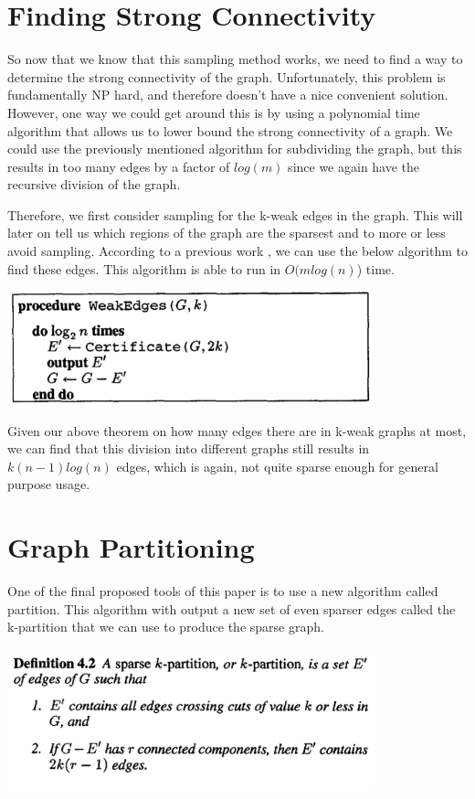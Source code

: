 \documentclass[11pt]{article}
\begin{document}
\section{Finding Strong Connectivity}

So now that we know that this sampling method works, we need to find a way to determine the strong connectivity of the graph. Unfortunately, this problem is fundamentally NP hard, and therefore doesn't have a nice convenient solution. However, one way we could get around this is by using a polynomial time algorithm that allows us to lower bound the strong connectivity of a graph. We could use the previously mentioned algorithm for subdividing the graph, but this results in too many edges by a factor of $log(m)$ since we again have the recursive division of the graph.

Therefore, we first consider sampling for the k-weak edges in the graph. This will later on tell us which regions of the graph are the sparsest and to more or less avoid sampling. According to a previous work \cite{NI92b}, we can use the below algorithm to find these edges. This algorithm is able to run in $O(m log(n)$) time.

\begin{center}
\includegraphics[width=0.8\textwidth]{figures/WeakEdges.png}
\end{center}

Given our above theorem on how many edges there are in k-weak graphs at most, we can find that this division into different graphs still results in $k(n-1)log(n)$ edges, which is again, not quite sparse enough for general purpose usage.

\section{Graph Partitioning}

One of the final proposed tools of this paper is to use a new algorithm called partition. This algorithm with output a new set of even sparser edges called the k-partition that we can use to produce the sparse graph. 

\begin{center}
\includegraphics[width=0.8\textwidth]{figures/def_4_2.png}
\end{center}
\end{document}
